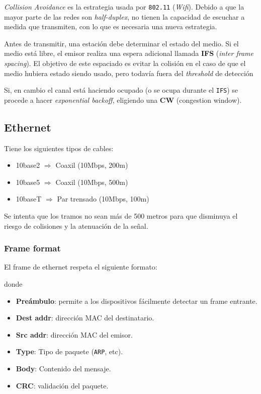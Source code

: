 \documentclass[]{article}
\begin{document}
\emph{Collision Avoidance} es la estrategia usada por \texttt{802.11} (\emph{Wifi}). Debido a que la mayor parte de las redes son \emph{half-duplex}, no tienen la capacidad de escuchar a medida que transmiten, con lo que es necesaria una nueva estrategia.

Antes de transmitir, una estación debe determinar el estado del medio. Si el medio está libre, el emisor realiza una espera adicional llamada \textbf{IFS} (\emph{inter frame spacing}). El objetivo de este espaciado es evitar la colisión en el caso de que el medio hubiera estado siendo usado, pero todavía fuera del \emph{threshold} de detección

Si, en cambio el canal está haciendo ocupado (o se ocupa durante el \texttt{IFS}) se procede a hacer \emph{exponential backoff}, eligiendo una \textbf{CW} (congestion window).



\subsection{Ethernet}
Tiene los siguientes tipos de cables:
\begin{itemize}
    \item 10base2 $\Rightarrow$ Coaxil (10Mbps, 200m)
    \item 10base5 $\Rightarrow$ Coaxil (10Mbps, 500m)
    \item 10baseT $\Rightarrow$ Par trensado (10Mbps, 100m)
\end{itemize}

Se intenta que los tramos no sean más de 500 metros para que disminuya el riesgo de colisiones y la atenuación de la señal.

\subsubsection{Frame format}
El frame de ethernet respeta el siguiente formato:

donde
\begin{itemize}
    \item \textbf{Preámbulo}: permite a los dispositivos fácilmente detectar un frame entrante.
    \item \textbf{Dest addr}: dirección MAC del destinatario.
    \item \textbf{Src addr}: dirección MAC del emisor.
    \item \textbf{Type}: Tipo de paquete (\texttt{ARP}, etc).
    \item \textbf{Body}: Contenido del mensaje.
    \item \textbf{CRC}: validación del paquete.
\end{itemize}
\end{document}
